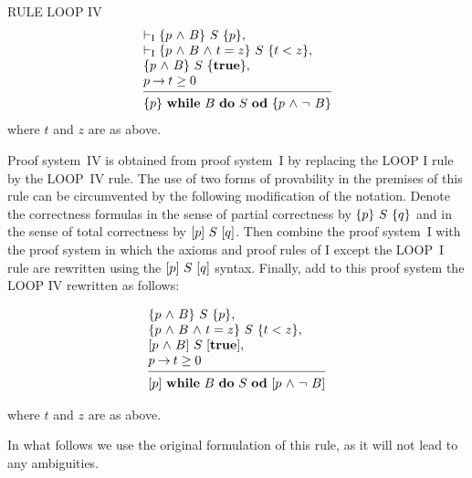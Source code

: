 \documentclass[runningheads]{llncs}       %
\begin{document}
\NI
RULE LOOP IV
\[
 \begin{array}{l}
  \vdash_{\rm{I}}  \HT{p \A B}{S}{p},             \\
  \vdash_{\rm{I}}   \HT{p \A B \A t=z}{S}{t<z},   \\
  \HT{p \A B}{S}{\mathbf{true}},                  \\
  p \ra t \geq 0                                 \\
  [-\medskipamount]
  \hrulefill                                      \\
  \HT{p}{\WDD{B}{S}}{p \A \neg\ B}
 \end{array}
\]
%
\NI
where $t$ and $z$ are as above.
\III

Proof system~IV is obtained from proof system~I by replacing the LOOP
I rule by the LOOP~IV rule. The use of two forms of provability in the
premises of this rule can be circumvented by the following
modification of the notation.  Denote the correctness
formulas in the sense of partial correctness by $\mbox{$\{{p}\}\ {S}\ \{{q}\}$}$ and in
the sense of total correctness by $[{p}]\ {S}\ [{q}]$. Then combine the
proof system~I with the proof system in which the axioms and proof
rules of I except the LOOP~I rule are rewritten using the
$[{p}]\ {S}\ [{q}]$ syntax. Finally, add to this proof system the LOOP IV
rewritten as follows:
\III

\[
 \begin{array}{l}
  \HT{p \A B}{S}{p},                      \\
  \HT{p \A B \A t=z}{S}{t<z},             \\
  \HTT{p \A B}{S}{\mathbf{true}},         \\
  p \ra t \geq 0                         \\
  [-\medskipamount]
  \hrulefill                              \\
  \HTT{p}{\WDD{B}{S}}{p \A \neg\ B}
 \end{array}
\]

\NI
where $t$ and $z$ are as above.
\III

In what follows we use the original formulation of this rule, 
as it will not lead to any ambiguities.



\end{document}
